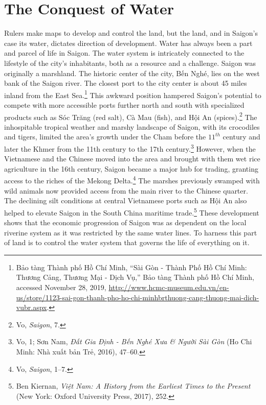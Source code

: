 \section{The Conquest of Water}
Rulers make maps to develop and control the land, but the land, and in Saigon’s case its water, dictates direction of development. Water has always been a part and parcel of life in Saigon. The water system is intricately connected to the lifestyle of the city’s inhabitants, both as a resource and a challenge. Saigon was originally a marshland. The historic center of the city, Bến Nghé, lies on the west bank of the Saigon river. The closest port to the city center is about 45 miles inland from the East Sea.\footnote{Bảo tàng Thành phố Hồ Chí Minh, “Sài Gòn - Thành Phố Hồ Chí Minh: Thương Cảng, Thương Mại - Dịch Vụ,” Bảo tàng Thành phố Hồ Chí Minh, accessed November 28, 2019, \url{http://www.hcmc-museum.edu.vn/en-us/store/1123-sai-gon-thanh-pho-ho-chi-minhbrthuong-cang-thuong-mai-dich-vubr.aspx}.} This awkward position hampered Saigon’s potential to compete with more accessible ports further north and south with specialized products such as Sóc Trăng (red salt), Cà Mau (fish), and Hội An (spices).\footnote{Vo, \textit{Saigon}, 7.} The inhospitable tropical weather and marshy landscape of Saigon, with its crocodiles and tigers, limited the area’s growth under the Cham before the $11^{th}$ century and later the Khmer from the 11th century to the 17th century.\footnote{Vo, 1; Sơn Nam, \textit{Đất Gia Định - Bến Nghé Xưa \& Người Sài Gòn} (Ho Chi Minh: Nhà xuất bản Trẻ, 2016), 47–60.} However, when the Vietnamese and the Chinese moved into the area and brought with them wet rice agriculture in the 16th century, Saigon became a major hub for trading, granting access to the riches of the Mekong Delta.\footnote{Vo, \textit{Saigon}, 1–7.} The marshes previously swamped with wild animals now provided access from the main river to the Chinese quarter. The declining silt conditions at central Vietnamese ports such as Hội An also helped to elevate Saigon in the South China maritime trade.\footnote{Ben Kiernan, \textit{Việt Nam: A History from the Earliest Times to the Present} (New York: Oxford University Press, 2017), 252.}  These development shows that the economic progression of Saigon was as dependent on the local riverine system as it was restricted by the same water lines. To harness this part of land is to control the water system that governs the life of everything on it.

